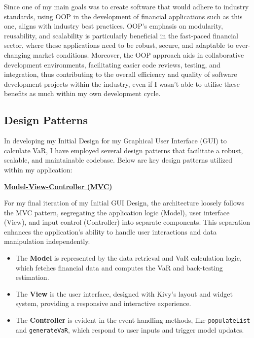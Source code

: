 \documentclass{article}
\begin{document}
Since one of my main goals was to create software that would adhere to industry standards, using OOP in the development of financial applications such as this one, aligns with industry best practices. OOP's emphasis on modularity, reusability, and scalability is particularly beneficial in the fast-paced financial sector, where these applications need to be robust, secure, and adaptable to ever-changing market conditions. Moreover, the OOP approach aids in collaborative development environments, facilitating easier code reviews, testing, and integration, thus contributing to the overall efficiency and quality of software development projects within the industry, even if I wasn't able to utilise these benefits as much within my own development cycle.


\subsection{Design Patterns}

In developing my Initial Design for my Graphical User Interface (GUI) to calculate VaR, I have employed several design patterns that facilitate a robust, scalable, and maintainable codebase. Below are key design patterns utilized within my application:\\\vspace{0.3cm}

\underline{\textbf{Model-View-Controller (MVC)}}\\\vspace{0.3cm}

For my final iteration of my Initial GUI Design, the architecture loosely follows the MVC pattern, segregating the application logic (Model), user interface (View), and input control (Controller) into separate components. This separation enhances the application's ability to handle user interactions and data manipulation independently.

\begin{itemize}
    \item The \textbf{Model} is represented by the data retrieval and VaR calculation logic, which fetches financial data and computes the VaR and back-testing estimation.
    \item The \textbf{View} is the user interface, designed with Kivy's layout and widget system, providing a responsive and interactive experience.
    \item The \textbf{Controller} is evident in the event-handling methods, like \texttt{populateList} and \texttt{generateVaR}, which respond to user inputs and trigger model updates.
\end{itemize}
\end{document}
